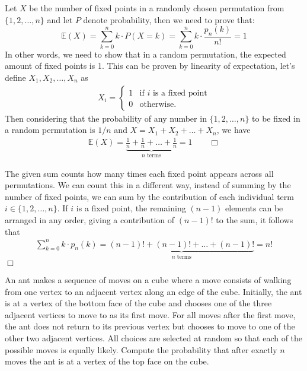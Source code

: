 \begin{solution}
    Let $X$ be the number of fixed points in a randomly chosen permutation from $\{1,2, \ldots, n\}$ and let $P$ denote probability, then we need to prove that:
    $$\mathbb{E}(X) = \sum_{k=0}^n k \cdot P(X=k)  = \sum_{k=0}^n k \cdot \frac{p_n(k)}{n!} = 1$$
    In other words, we need to show that in a random permutation, the expected amount of fixed points is 1. This can be proven by linearity of expectation, let's define $X_1, X_2, \ldots, X_n$ as
    \begin{align*}
        X_i = 
        \begin{cases}
            1 & \text{if $i$ is a fixed point} \\
            0 &\text{otherwise.}
        \end{cases}
    \end{align*}
    Then considering that the probability of any number in $\{ 1, 2, \ldots, n\}$ to be fixed in a random permutation is $1/n$ and $X=X_1 + X_2 + \ldots + X_n$, we have
    \begin{align*}
        \mathbb{E}(X) = \underbrace{ \frac{1}{n} + \frac{1}{n} + \ldots + \frac{1}{n}}_{n \text{ terms}} = 1 \qquad\Box
    \end{align*}
\end{solution}

\begin{solution}
    The given sum counts how many times each fixed point appears across all permutations. We can count this in a different way, instead of summing by the number of fixed points, we can sum by the contribution of each individual term $i \in \{1, 2, \ldots, n \}$. If $i$ is a fixed point, the remaining $(n-1)$ elements can be arranged in any order, giving a contribution of $(n-1)!$ to the sum, it follows that
    \begin{align*}
        \sum_{k=0}^n k \cdot p_n(k) = \underbrace{ (n-1)! + (n-1)! + \ldots + (n-1)!}_{n \text{ terms}} = n!
    \end{align*}
    $\Box$
\end{solution}

\begin{problem}[C][5][AIME II 2021/8]
    An ant makes a sequence of moves on a cube where a move consists of walking from one vertex to an adjacent vertex along an edge of the cube. Initially, the ant is at a vertex of the bottom face of the cube and chooses one of the three adjacent vertices to move to as its first move. For all moves after the first move, the ant does not return to its previous vertex but chooses to move to one of the other two adjacent vertices. All choices are selected at random so that each of the possible moves is equally likely. Compute the probability that after exactly $n$ moves the ant is at a vertex of the top face on the cube.
\end{problem}

